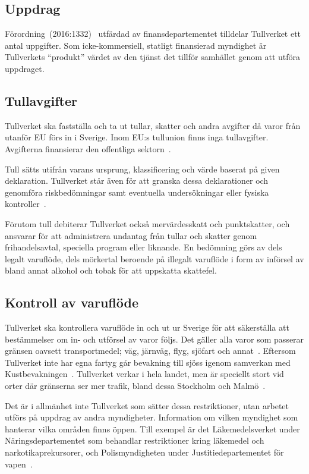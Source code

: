\subsection{Uppdrag}

Förordning~(2016:1332)~\cite{forordning} utfärdad av finansdepartementet
tilldelar Tullverket ett antal uppgifter. Som icke-kommersiell, statligt
finansierad myndighet är Tullverkets ``produkt'' värdet av den tjänst det
tillför samhället genom att utföra uppdraget.

\subsection{Tullavgifter}

Tullverket ska fastställa och ta ut tullar, skatter och andra avgifter då
varor från utanför EU förs in i Sverige. Inom EU:s tullunion finns inga
tullavgifter. Avgifterna finansierar den offentliga sektorn~\cite{tull}.

Tull sätts utifrån varans ursprung, klassificering och värde baserat på given
deklaration. Tullverket står även för att granska dessa deklarationer och
genomföra riskbedömningar samt eventuella undersökningar eller fysiska
kontroller~\cite{verksamhet}.

Förutom tull debiterar Tullverket också mervärdesskatt och punktskatter,
och ansvarar för att administrera undantag från tullar och skatter genom
frihandelsavtal, speciella program eller liknande.
%
En bedömning görs av dels legalt varuflöde, dels mörkertal beroende på
illegalt varuflöde i form av införsel av bland annat alkohol och tobak
för att uppskatta skattefel.

\subsection{Kontroll av varuflöde}

Tullverket ska kontrollera varuflöde in och ut ur Sverige för att säkerställa
att bestämmelser om in- och utförsel av varor följs. Det gäller alla varor som
passerar gränsen oavsett transportmedel; väg, järnväg, flyg, sjöfart och
annat~\cite{varuflodet}.
%
Eftersom Tullverket inte har egna fartyg går bevakning till sjöss igenom
samverkan med Kustbevakningen~\cite{kustbevakningen}.
%
Tullverket verkar i hela landet, men är speciellt stort vid orter där gränserna
ser mer trafik, bland dessa Stockholm och Malmö~\cite{krisinformation}.

Det är i allmänhet inte Tullverket som sätter dessa restriktioner, utan arbetet
utförs på uppdrag av andra myndigheter. Information om vilken myndighet som
hanterar vilka områden finns öppen. Till exempel är det Läkemedelsverket under
Näringsdepartementet som behandlar restriktioner kring läkemedel och
narkotikaprekursorer, och Polismyndigheten under Justitiedepartementet för
vapen~\cite{kontroller}.


